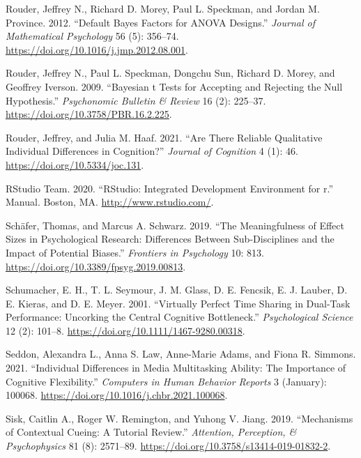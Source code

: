 \documentclass{article}
\newlength{\cslhangindent}
\newlength{\cslentryspacingunit} %
\newenvironment{CSLReferences}[2] %
 {%
  \setlength{\parindent}{0pt}
  \ifodd #1
  \let\oldpar\par
  \def\par{\hangindent=\cslhangindent\oldpar}
  \fi
  \setlength{\parskip}{#2\cslentryspacingunit}
 }%
 {}
\begin{document}
\begin{CSLReferences}{1}{0}
\leavevmode{}%
Rouder, Jeffrey N., Richard D. Morey, Paul L. Speckman, and Jordan M. Province. 2012. {``Default {Bayes} Factors for {ANOVA} Designs.''} \emph{Journal of Mathematical Psychology} 56 (5): 356--74. \url{https://doi.org/10.1016/j.jmp.2012.08.001}.

\leavevmode{}%
Rouder, Jeffrey N., Paul L. Speckman, Dongchu Sun, Richard D. Morey, and Geoffrey Iverson. 2009. {``Bayesian t Tests for Accepting and Rejecting the Null Hypothesis.''} \emph{Psychonomic Bulletin \& Review} 16 (2): 225--37. \url{https://doi.org/10.3758/PBR.16.2.225}.

\leavevmode{}%
Rouder, Jeffrey, and Julia M. Haaf. 2021. {``Are {There} {Reliable} {Qualitative} {Individual} {Differences} in {Cognition}?''} \emph{Journal of Cognition} 4 (1): 46. \url{https://doi.org/10.5334/joc.131}.

\leavevmode{}%
RStudio Team. 2020. {``{RStudio}: {Integrated} Development Environment for r.''} Manual. Boston, MA. \url{http://www.rstudio.com/}.

\leavevmode{}%
Schäfer, Thomas, and Marcus A. Schwarz. 2019. {``The {Meaningfulness} of {Effect} {Sizes} in {Psychological} {Research}: {Differences} {Between} {Sub}-{Disciplines} and the {Impact} of {Potential} {Biases}.''} \emph{Frontiers in Psychology} 10: 813. \url{https://doi.org/10.3389/fpsyg.2019.00813}.

\leavevmode{}%
Schumacher, E. H., T. L. Seymour, J. M. Glass, D. E. Fencsik, E. J. Lauber, D. E. Kieras, and D. E. Meyer. 2001. {``Virtually Perfect Time Sharing in Dual-Task Performance: Uncorking the Central Cognitive Bottleneck.''} \emph{Psychological Science} 12 (2): 101--8. \url{https://doi.org/10.1111/1467-9280.00318}.

\leavevmode{}%
Seddon, Alexandra L., Anna S. Law, Anne-Marie Adams, and Fiona R. Simmons. 2021. {``Individual Differences in Media Multitasking Ability: {The} Importance of Cognitive Flexibility.''} \emph{Computers in Human Behavior Reports} 3 (January): 100068. \url{https://doi.org/10.1016/j.chbr.2021.100068}.

\leavevmode{}%
Sisk, Caitlin A., Roger W. Remington, and Yuhong V. Jiang. 2019. {``Mechanisms of Contextual Cueing: {A} Tutorial Review.''} \emph{Attention, Perception, \& Psychophysics} 81 (8): 2571--89. \url{https://doi.org/10.3758/s13414-019-01832-2}.


\end{CSLReferences}
\end{document}

